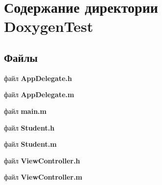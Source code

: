 \section{Содержание директории Doxygen\+Test}
\label{dir_6f970263d2afd7eef52b17d8c2ea3d76}
\subsection*{Файлы}
\begin{DoxyCompactItemize}
\item 
файл {\bfseries App\+Delegate.\+h}
\item 
файл {\bfseries App\+Delegate.\+m}
\item 
файл {\bfseries main.\+m}
\item 
файл {\bfseries Student.\+h}
\item 
файл {\bfseries Student.\+m}
\item 
файл {\bfseries View\+Controller.\+h}
\item 
файл {\bfseries View\+Controller.\+m}
\end{DoxyCompactItemize}
